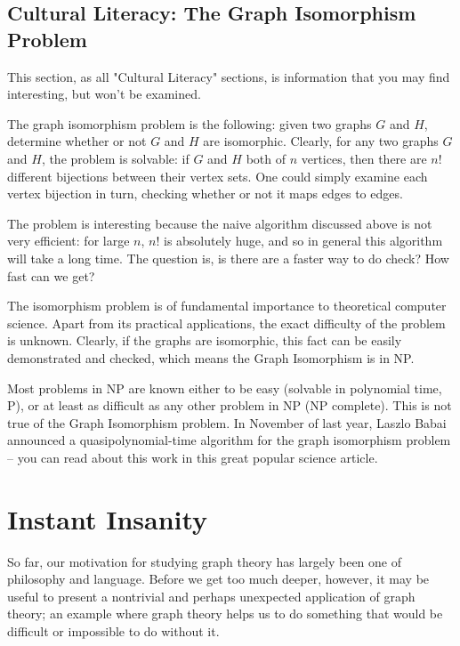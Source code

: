 \documentclass[10pt,]{book}
\theoremstyle{plain}
\theoremstyle{definition}
\theoremstyle{definition}
\theoremstyle{definition}
\begin{document}
\subsection[{Cultural Literacy: The Graph Isomorphism Problem}]{Cultural Literacy: The Graph Isomorphism Problem}\label{subsection-9}
\hypertarget{p-48}{}%
This section, as all "Cultural Literacy" sections, is information that you may find interesting, but won't be examined.%
\par
\hypertarget{p-49}{}%
The graph isomorphism problem is the following: given two graphs \(G\) and \(H\), determine whether or not \(G\) and \(H\) are isomorphic. Clearly, for any two graphs \(G\) and \(H\), the problem is solvable: if \(G\) and \(H\) both of \(n\) vertices, then there are \(n!\) different bijections between their vertex sets.  One could simply examine each vertex bijection in turn, checking whether or not it maps edges to edges.%
\par
\hypertarget{p-50}{}%
The problem is interesting because the naive algorithm discussed above is not very efficient: for large \(n\), \(n!\) is absolutely huge, and so in general this algorithm will take a long time.  The question is, is there are a faster way to do check? How fast can we get?%
\par
\hypertarget{p-51}{}%
The isomorphism problem is of fundamental importance to theoretical computer science. Apart from its practical applications, the exact difficulty of the problem is unknown. Clearly, if the graphs are isomorphic, this fact can be easily demonstrated and checked, which means the Graph Isomorphism is in NP.%
\par
\hypertarget{p-52}{}%
Most problems in NP are known either to be easy (solvable in polynomial time, P), or at least as difficult as any other problem in NP (NP complete). This is not true of the Graph Isomorphism problem. In November of last year, Laszlo Babai announced a quasipolynomial-time algorithm for the graph isomorphism problem – you can read about this work in this great popular science article.%
\typeout{************************************************}
\typeout{************************************************}
\section[{Instant Insanity}]{Instant Insanity}\label{s_intro_instantinsanity}
\hypertarget{p-53}{}%
So far, our motivation for studying graph theory has largely been one of philosophy and language.  Before we get too much deeper, however, it may be useful to present a nontrivial and perhaps unexpected application of graph theory; an example where graph theory helps us to do something that would be difficult or impossible to do without it.%
\typeout{************************************************}
\typeout{************************************************}
\end{document}
